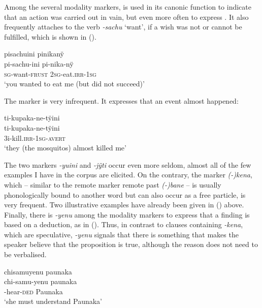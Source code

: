 Among the several modality markers,  is used in its canonic function to indicate that an action was carried out in vain, but even more often to express . It also frequently attaches to the verb \textit{-sachu} ‘want’, if a wish was not or cannot be fulfilled, which is shown in ().

\ea\label{ex:Sketch-FRUST}
\begingl
\glpreamble pisachuini pinikanÿ\\
\gla pi-sachu-ini pi-nika-nÿ\\
\textsc{sg}-want-\textsc{frust} 2\textsc{sg}-eat.\textsc{irr}-1\textsc{sg}\\
\glft ‘you wanted to eat me (but did not succeed)’\\
\endgl
\xe


The  marker is very infrequent. It expresses that an event almost happened:

\ea\label{ex:Sketch-AVERT}
\begingl
\glpreamble ti-kupaka-ne-tÿini\\
\gla ti-kupaka-ne-tÿini\\
\glb 3i-kill.\textsc{irr}-1\textsc{sg}-\textsc{avert}\\
\glft ‘they (the mosquitos) almost killed me’\\
\endgl
\xe

The two  markers \textit{-yuini} and \textit{-jÿti} occur even more seldom, almost all of the few examples I have in the corpus are elicited. On the contrary, the  marker \textit{(-)kena}, which – similar to the remote marker remote past \textit{(-)bane} – is usually phonologically bound to another word but can also occur as a free particle, is very frequent. Two illustrative examples have already been given in () above. Finally, there is \textit{-yenu} among the modality markers to express that a finding is based on a deduction, as in (). Thus, in contrast to clauses containing \textit{-kena}, which are speculative, \textit{-yenu} signals that there is something that makes the speaker believe that the proposition is true, although the reason does not need to be verbalised.

\ea\label{ex:Sketch-DED}
\begingl
\glpreamble chisamuyenu paunaka\\
\gla chi-samu-yenu paunaka\\
-hear-\textsc{ded} Paunaka\\
\glft ‘she must understand Paunaka’\\
\endgl
\xe
{}

